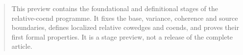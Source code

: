 


\maketitle

\begin{abstract}
This preview contains the foundational and definitional stages of the
relative-coend programme.  It fixes the base, variance, coherence and source
boundaries, defines localized relative cowedges and coends, and proves their
first formal properties.  It is a stage preview, not a release of the complete
article.
\end{abstract}

\tableofcontents







